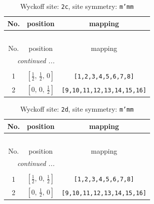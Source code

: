 \documentclass[fleqn,8pt]{jsarticle}
\begin{document}
\renewcommand{\arraystretch}{1.2}
\begin{longtable}{ccc}
\caption{Wyckoff site: {\tt 2c}, site symmetry: {\tt m'mm}}
 \\
 \hline \hline
No. & position & mapping \\ \hline \endfirsthead

\multicolumn{2}{l}{\tablename\ \thetable{}} \\
 \hline \hline
No. & position & mapping \\ \hline \endhead

 \hline \hline
\multicolumn{2}{r}{\footnotesize\it continued ...} \\ \endfoot

 \hline \hline
\multicolumn{2}{r}{} \\ \endlastfoot

1 & $\left[ \frac{1}{2},\, \frac{1}{2},\, 0 \right]$ & {\tt [1,2,3,4,5,6,7,8]} \\ \hline
2 & $\left[ 0,\, 0,\, \frac{1}{2} \right]$ & {\tt [9,10,11,12,13,14,15,16]} \\
\end{longtable}
\renewcommand{\arraystretch}{1.2}
\begin{longtable}{ccc}
\caption{Wyckoff site: {\tt 2d}, site symmetry: {\tt m'mm}}
 \\
 \hline \hline
No. & position & mapping \\ \hline \endfirsthead

\multicolumn{2}{l}{\tablename\ \thetable{}} \\
 \hline \hline
No. & position & mapping \\ \hline \endhead

 \hline \hline
\multicolumn{2}{r}{\footnotesize\it continued ...} \\ \endfoot

 \hline \hline
\multicolumn{2}{r}{} \\ \endlastfoot

1 & $\left[ \frac{1}{2},\, 0,\, \frac{1}{2} \right]$ & {\tt [1,2,3,4,5,6,7,8]} \\ \hline
2 & $\left[ 0,\, \frac{1}{2},\, 0 \right]$ & {\tt [9,10,11,12,13,14,15,16]} \\
\end{longtable}
\renewcommand{\arraystretch}{1.2}
\end{document}
